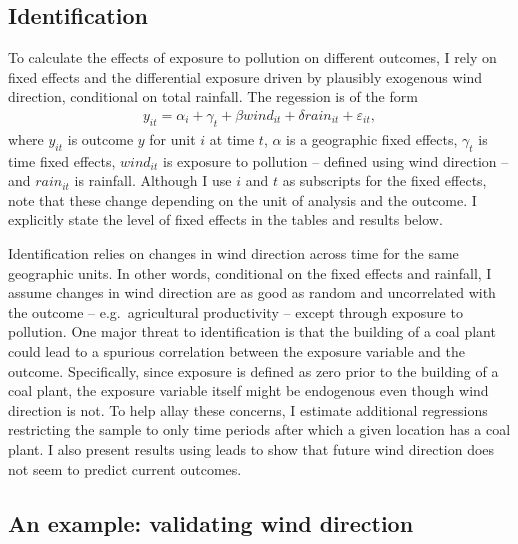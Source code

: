 \documentclass[
]{article}
\begin{document}
\hypertarget{identification}{%
\subsection{\texorpdfstring{Identification \label{identification}}{Identification }}\label{identification}}

To calculate the effects of exposure to pollution on different outcomes, I rely on fixed effects and the differential exposure driven by plausibly exogenous wind direction, conditional on total rainfall. The regession is of the form
\begin{gather} y_{it} = \alpha_{i} + \gamma_{t} + \beta wind_{it} + \delta rain_{it} + \varepsilon_{it}, \end{gather}
where \(y_{it}\) is outcome \(y\) for unit \(i\) at time \(t\), \(\alpha\) is a geographic fixed effects, \(\gamma_t\) is time fixed effects, \(wind_{it}\) is exposure to pollution -- defined using wind direction -- and \(rain_{it}\) is rainfall. Although I use \(i\) and \(t\) as subscripts for the fixed effects, note that these change depending on the unit of analysis and the outcome. I explicitly state the level of fixed effects in the tables and results below.

Identification relies on changes in wind direction across time for the same geographic units. In other words, conditional on the fixed effects and rainfall, I assume changes in wind direction are as good as random and uncorrelated with the outcome -- e.g.~agricultural productivity -- except through exposure to pollution. One major threat to identification is that the building of a coal plant could lead to a spurious correlation between the exposure variable and the outcome. Specifically, since exposure is defined as zero prior to the building of a coal plant, the exposure variable itself might be endogenous even though wind direction is not. To help allay these concerns, I estimate additional regressions restricting the sample to only time periods after which a given location has a coal plant. I also present results using leads to show that future wind direction does not seem to predict current outcomes.

\hypertarget{an-example-validating-wind-direction}{%
\subsection{\texorpdfstring{An example: validating wind direction \label{validation}}{An example: validating wind direction }}\label{an-example-validating-wind-direction}}
\end{document}
